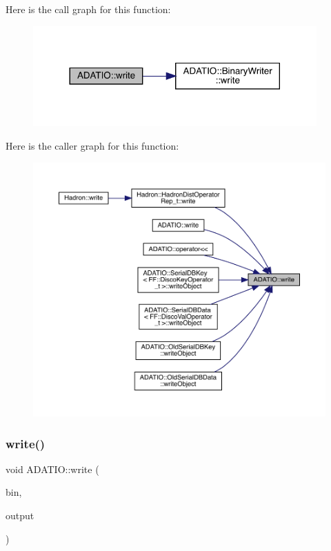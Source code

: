 Here is the call graph for this function\+:
\nopagebreak
\begin{figure}[H]
\begin{center}
\leavevmode
\includegraphics[width=308pt]{d0/dba/namespaceADATIO_a12d01adc4b592d85f0f5f5c101205c08_cgraph}
\end{center}
\end{figure}
Here is the caller graph for this function\+:
\nopagebreak
\begin{figure}[H]
\begin{center}
\leavevmode
\includegraphics[width=350pt]{d0/dba/namespaceADATIO_a12d01adc4b592d85f0f5f5c101205c08_icgraph}
\end{center}
\end{figure}
\mbox{\label{namespaceADATIO_a7a53460de240b5544de0b7c60b2eb455}} 
\subsubsection{\texorpdfstring{write()}{write()}\hspace{0.1cm}{\footnotesize\ttfamily [2/25]}}
{\footnotesize\ttfamily void A\+D\+A\+T\+I\+O\+::write (\begin{DoxyParamCaption}\item[{\mbox{\hyperlink{classADATIO_1_1BinaryWriter}{Binary\+Writer}} \&}]{bin,  }\item[{const char $\ast$}]{output }\end{DoxyParamCaption})}

